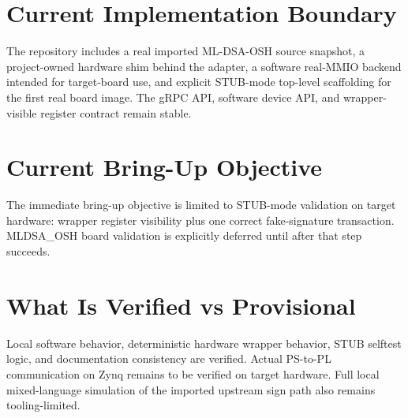 \section{Current Implementation Boundary}
The repository includes a real imported ML-DSA-OSH source snapshot, a project-owned hardware shim behind the adapter, a software real-MMIO backend intended for target-board use, and explicit STUB-mode top-level scaffolding for the first real board image. The gRPC API, software device API, and wrapper-visible register contract remain stable.

\section{Current Bring-Up Objective}
The immediate bring-up objective is limited to STUB-mode validation on target hardware: wrapper register visibility plus one correct fake-signature transaction. MLDSA\_OSH board validation is explicitly deferred until after that step succeeds.

\section{What Is Verified vs Provisional}
Local software behavior, deterministic hardware wrapper behavior, STUB selftest logic, and documentation consistency are verified. Actual PS-to-PL communication on Zynq remains to be verified on target hardware. Full local mixed-language simulation of the imported upstream sign path also remains tooling-limited.